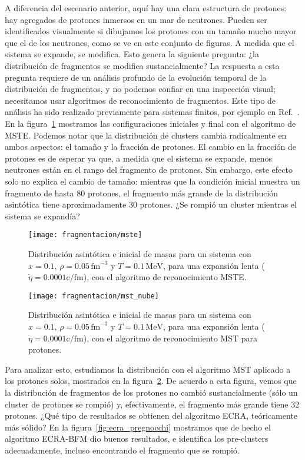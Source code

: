 A diferencia del escenario anterior, aquí hay una clara estructura de protones: hay agregados de protones inmersos en un mar de neutrones.
Pueden ser identificados visualmente si dibujamos los protones con un tamaño mucho mayor que el de los neutrones, como se ve en este conjunto de figuras.
A medida que el sistema se expande, se modifica.
Esto genera la siguiente pregunta: ¿la distribución de fragmentos se modifica sustancialmente?
La respuesta a esta pregunta requiere de un análisis profundo de la evolución temporal de la distribución de fragmentos, y no podemos confiar en una inspección visual; necesitamos usar algoritmos de reconocimiento de fragmentos.
Este tipo de análisis ha sido realizado previamente para sistemas finitos, por ejemplo en Ref.~\cite{dorso_fluctuation_1994, strachan_fragment_1997}.
En la figura~\ref{fig:mste_pregnocchi} mostramos las configuraciones iniciales y final con el algoritmo de MSTE.\@
Podemos notar que la distribución de clusters cambia radicalmente en ambos aspectos: el tamaño y la fracción de protones.
El cambio en la fracción de protones es de esperar ya que, a medida que el sistema se expande, menos neutrones están en el rango del fragmento de protones.
Sin embargo, este efecto solo no explica el cambio de tamaño: mientras que la condición inicial muestra un fragmento de hasta 80 protones, el fragmento más grande de la distribución asintótica tiene aproximadamente 30 protones.
¿Se rompió un cluster mientras el sistema se expandía?

\begin{figure}
  \texttt{[image: fragmentacion/mste]}
  \caption{Distribución asintótica e inicial de masas para un sistema con $x = 0.1$, $\rho = 0.05\,\text{fm}^{-3}$ y $T = 0.1\,\text{MeV}$, para una expansión lenta ($\dot{\eta} = 0.0001\text{c/fm}$), con el algoritmo de reconocimiento MSTE.}
\label{fig:mste_pregnocchi}
\end{figure}

\begin{figure}
  \texttt{[image: fragmentacion/mst\_nube]}
  \caption{Distribución asintótica e inicial de masas para un sistema con $x = 0.1$, $\rho = 0.05\,\text{fm}^{-3}$ y $T = 0.1\,\text{MeV}$, para una expansión lenta ($\dot{\eta} = 0.0001\text{c/fm}$), con el algoritmo de reconocimiento MST para protones.}
\label{fig:mst_pregnocchi}
\end{figure}

Para analizar esto, estudiamos la distribución con el algoritmo MST aplicado a los protones solos, mostrados en la figura~\ref{fig:mst_pregnocchi}.
De acuerdo a esta figura, vemos que la distribución de fragmentos de los protones no cambió sustancialmente (sólo un cluster de protones se rompió) y, efectivamente, el fragmento más grande tiene 32 protones.
¿Qué tipo de resultados se obtienen del algoritmo ECRA, teóricamente más sólido?
En la figura~\ref{fig:ecra_pregnocchi} mostramos que de hecho el algoritmo ECRA-BFM dio buenos resultados, e identifica los pre-clusters adecuadamente, incluso encontrando el fragmento que se rompió.


